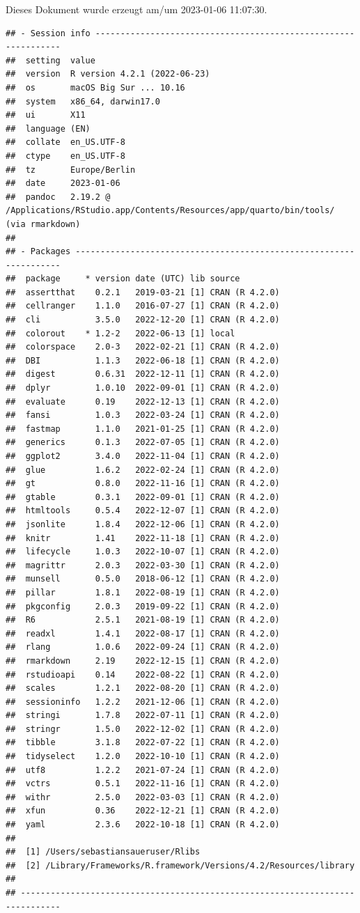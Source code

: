 \documentclass[
  a4paper,
  DIV=11]{scrreprt}
\theoremstyle{definition}
\theoremstyle{remark}
\begin{document}
Dieses Dokument wurde erzeugt am/um 2023-01-06 11:07:30.

\begin{verbatim}
## - Session info ---------------------------------------------------------------
##  setting  value
##  version  R version 4.2.1 (2022-06-23)
##  os       macOS Big Sur ... 10.16
##  system   x86_64, darwin17.0
##  ui       X11
##  language (EN)
##  collate  en_US.UTF-8
##  ctype    en_US.UTF-8
##  tz       Europe/Berlin
##  date     2023-01-06
##  pandoc   2.19.2 @ /Applications/RStudio.app/Contents/Resources/app/quarto/bin/tools/ (via rmarkdown)
## 
## - Packages -------------------------------------------------------------------
##  package     * version date (UTC) lib source
##  assertthat    0.2.1   2019-03-21 [1] CRAN (R 4.2.0)
##  cellranger    1.1.0   2016-07-27 [1] CRAN (R 4.2.0)
##  cli           3.5.0   2022-12-20 [1] CRAN (R 4.2.0)
##  colorout    * 1.2-2   2022-06-13 [1] local
##  colorspace    2.0-3   2022-02-21 [1] CRAN (R 4.2.0)
##  DBI           1.1.3   2022-06-18 [1] CRAN (R 4.2.0)
##  digest        0.6.31  2022-12-11 [1] CRAN (R 4.2.0)
##  dplyr         1.0.10  2022-09-01 [1] CRAN (R 4.2.0)
##  evaluate      0.19    2022-12-13 [1] CRAN (R 4.2.0)
##  fansi         1.0.3   2022-03-24 [1] CRAN (R 4.2.0)
##  fastmap       1.1.0   2021-01-25 [1] CRAN (R 4.2.0)
##  generics      0.1.3   2022-07-05 [1] CRAN (R 4.2.0)
##  ggplot2       3.4.0   2022-11-04 [1] CRAN (R 4.2.0)
##  glue          1.6.2   2022-02-24 [1] CRAN (R 4.2.0)
##  gt            0.8.0   2022-11-16 [1] CRAN (R 4.2.0)
##  gtable        0.3.1   2022-09-01 [1] CRAN (R 4.2.0)
##  htmltools     0.5.4   2022-12-07 [1] CRAN (R 4.2.0)
##  jsonlite      1.8.4   2022-12-06 [1] CRAN (R 4.2.0)
##  knitr         1.41    2022-11-18 [1] CRAN (R 4.2.0)
##  lifecycle     1.0.3   2022-10-07 [1] CRAN (R 4.2.0)
##  magrittr      2.0.3   2022-03-30 [1] CRAN (R 4.2.0)
##  munsell       0.5.0   2018-06-12 [1] CRAN (R 4.2.0)
##  pillar        1.8.1   2022-08-19 [1] CRAN (R 4.2.0)
##  pkgconfig     2.0.3   2019-09-22 [1] CRAN (R 4.2.0)
##  R6            2.5.1   2021-08-19 [1] CRAN (R 4.2.0)
##  readxl        1.4.1   2022-08-17 [1] CRAN (R 4.2.0)
##  rlang         1.0.6   2022-09-24 [1] CRAN (R 4.2.0)
##  rmarkdown     2.19    2022-12-15 [1] CRAN (R 4.2.0)
##  rstudioapi    0.14    2022-08-22 [1] CRAN (R 4.2.0)
##  scales        1.2.1   2022-08-20 [1] CRAN (R 4.2.0)
##  sessioninfo   1.2.2   2021-12-06 [1] CRAN (R 4.2.0)
##  stringi       1.7.8   2022-07-11 [1] CRAN (R 4.2.0)
##  stringr       1.5.0   2022-12-02 [1] CRAN (R 4.2.0)
##  tibble        3.1.8   2022-07-22 [1] CRAN (R 4.2.0)
##  tidyselect    1.2.0   2022-10-10 [1] CRAN (R 4.2.0)
##  utf8          1.2.2   2021-07-24 [1] CRAN (R 4.2.0)
##  vctrs         0.5.1   2022-11-16 [1] CRAN (R 4.2.0)
##  withr         2.5.0   2022-03-03 [1] CRAN (R 4.2.0)
##  xfun          0.36    2022-12-21 [1] CRAN (R 4.2.0)
##  yaml          2.3.6   2022-10-18 [1] CRAN (R 4.2.0)
## 
##  [1] /Users/sebastiansaueruser/Rlibs
##  [2] /Library/Frameworks/R.framework/Versions/4.2/Resources/library
## 
## ------------------------------------------------------------------------------
\end{verbatim}
\end{document}
